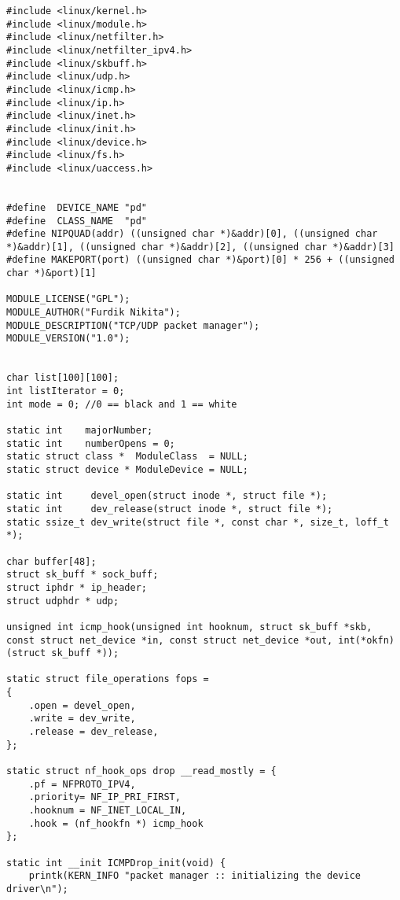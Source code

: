 \begin{lstlisting}
#include <linux/kernel.h>
#include <linux/module.h>
#include <linux/netfilter.h>
#include <linux/netfilter_ipv4.h>
#include <linux/skbuff.h>
#include <linux/udp.h>
#include <linux/icmp.h>
#include <linux/ip.h>
#include <linux/inet.h>
#include <linux/init.h>
#include <linux/device.h>
#include <linux/fs.h>
#include <linux/uaccess.h>


#define  DEVICE_NAME "pd"
#define  CLASS_NAME  "pd"
#define NIPQUAD(addr) ((unsigned char *)&addr)[0], ((unsigned char *)&addr)[1], ((unsigned char *)&addr)[2], ((unsigned char *)&addr)[3]
#define MAKEPORT(port) ((unsigned char *)&port)[0] * 256 + ((unsigned char *)&port)[1]

MODULE_LICENSE("GPL");
MODULE_AUTHOR("Furdik Nikita");
MODULE_DESCRIPTION("TCP/UDP packet manager");
MODULE_VERSION("1.0");


char list[100][100];
int listIterator = 0;
int mode = 0; //0 == black and 1 == white

static int    majorNumber;
static int    numberOpens = 0;
static struct class *  ModuleClass  = NULL;
static struct device * ModuleDevice = NULL;

static int     devel_open(struct inode *, struct file *);
static int     dev_release(struct inode *, struct file *);
static ssize_t dev_write(struct file *, const char *, size_t, loff_t *); 

char buffer[48];
struct sk_buff * sock_buff;
struct iphdr * ip_header;
struct udphdr * udp;

unsigned int icmp_hook(unsigned int hooknum, struct sk_buff *skb, const struct net_device *in, const struct net_device *out, int(*okfn)(struct sk_buff *));

static struct file_operations fops =
{
	.open = devel_open,
	.write = dev_write,
	.release = dev_release,
};

static struct nf_hook_ops drop __read_mostly = {
	.pf = NFPROTO_IPV4,
	.priority= NF_IP_PRI_FIRST,
	.hooknum = NF_INET_LOCAL_IN,
	.hook = (nf_hookfn *) icmp_hook
};

static int __init ICMPDrop_init(void) {
	printk(KERN_INFO "packet manager :: initializing the device driver\n");
	

\end{lstlisting}
